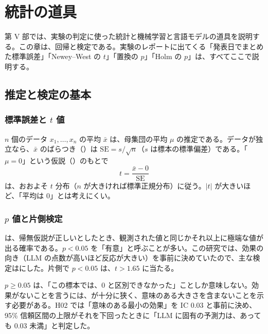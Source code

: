 \chapter{統計の道具}\label{ch:stat}

第 V 部では、実験の判定に使った統計と機械学習と言語モデルの道具を説明する。この章は、回帰と検定である。実験のレポートに出てくる「発表日でまとめた標準誤差」「Newey--West の $t$」「置換の $p$」「Holm の $p$」は、すべてここで説明する。

\section{推定と検定の基本}

\subsection{標準誤差と $t$ 値}

$n$ 個のデータ $x_1,\dots,x_n$ の平均 $\bar x$ は、母集団の平均 $\mu$ の推定である。データが独立なら、$\bar x$ のばらつき（）は $\text{SE} = s/\sqrt{n}$（$s$ は標本の標準偏差）である。「$\mu = 0$」という仮説（）のもとで
\begin{equation}
t = \frac{\bar x - 0}{\text{SE}}
\end{equation}
は、おおよそ $t$ 分布（$n$ が大きければ標準正規分布）に従う。$|t|$ が大きいほど、「平均は 0」とは考えにくい。

\subsection{$p$ 値と片側検定}

は、帰無仮説が正しいとしたとき、観測された値と同じかそれ以上に極端な値が出る確率である。$p<0.05$ を「有意」と呼ぶことが多い。この研究では、効果の向き（LLM の点数が高いほど反応が大きい）を事前に決めていたので、主な検定はにした。片側で $p<0.05$ は、$t>1.65$ に当たる。

\begin{notebox}
$p\ge0.05$ は、「この標本では、0 と区別できなかった」ことしか意味しない。効果がないことを言うには、が十分に狭く、意味のある大きさを含まないことを示す必要がある。H02 では「意味のある最小の効果」を IC 0.03 と事前に決め、95\% 信頼区間の上限がそれを下回ったときに「LLM に固有の予測力は、あっても 0.03 未満」と判定した。
\end{notebox}


